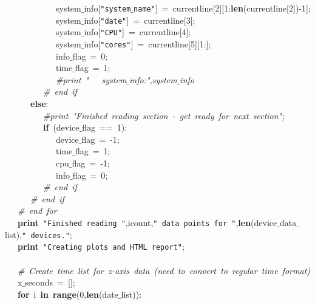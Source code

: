 \mbox{}\ \ \ \ \ \ \ \ \ \ \ \ system$\_$info[\texttt{"{}system$\_$name"{}}]\ =\ currentline[2][1:\textbf{len}(currentline[2])-1]; \\
\mbox{}\ \ \ \ \ \ \ \ \ \ \ \ system$\_$info[\texttt{"{}date"{}}]\ =\ currentline[3]; \\
\mbox{}\ \ \ \ \ \ \ \ \ \ \ \ system$\_$info[\texttt{"{}CPU"{}}]\ =\ currentline[4]; \\
\mbox{}\ \ \ \ \ \ \ \ \ \ \ \ system$\_$info[\texttt{"{}cores"{}}]\ =\ currentline[5][1:]; \\
\mbox{}\ \ \ \ \ \ \ \ \ \ \ \ info$\_$flag\ =\ 0; \\
\mbox{}\ \ \ \ \ \ \ \ \ \ \ \ time$\_$flag\ =\ 1; \\
\mbox{}\ \ \ \ \ \ \ \ \ \ \ \ \textit{\#print\ "{}\ \ \ system$\_$info:"{},system$\_$info} \\
\mbox{}\ \ \ \ \ \ \ \ \ \textit{\#\ end\ if} \\
\mbox{}\ \ \ \ \ \ \textbf{else}: \\
\mbox{}\ \ \ \ \ \ \ \ \ \textit{\#print\ "{}Finished\ reading\ section\ -\ get\ ready\ for\ next\ section"{};} \\
\mbox{}\ \ \ \ \ \ \ \ \ \textbf{if}\ (device$\_$flag\ ==\ 1): \\
\mbox{}\ \ \ \ \ \ \ \ \ \ \ \ device$\_$flag\ =\ -1; \\
\mbox{}\ \ \ \ \ \ \ \ \ \ \ \ time$\_$flag\ =\ 1; \\
\mbox{}\ \ \ \ \ \ \ \ \ \ \ \ cpu$\_$flag\ =\ -1; \\
\mbox{}\ \ \ \ \ \ \ \ \ \ \ \ info$\_$flag\ =\ 0; \\
\mbox{}\ \ \ \ \ \ \ \ \ \textit{\#\ end\ if} \\
\mbox{}\ \ \ \ \ \ \textit{\#\ end\ if} \\
\mbox{}\ \ \ \textit{\#\ end\ for} \\
\mbox{}\ \ \ \textbf{print}\ \texttt{"{}Finished\ reading\ "{}},icount,\texttt{"{}\ data\ points\ for\ "{}},\textbf{len}(device$\_$data$\_$list),\texttt{"{}\ devices."{}}; \\
\mbox{}\ \ \ \textbf{print}\ \texttt{"{}Creating\ plots\ and\ HTML\ report"{}}; \\
\mbox{}\ \ \  \\
\mbox{}\ \ \ \textit{\#\ Create\ time\ list\ for\ x-axis\ data\ (need\ to\ convert\ to\ regular\ time\ format)} \\
\mbox{}\ \ \ x$\_$seconds\ =\ []; \\
\mbox{}\ \ \ \textbf{for}\ i\ \textbf{in}\ \textbf{range}(0,\textbf{len}(date$\_$list)): \\
